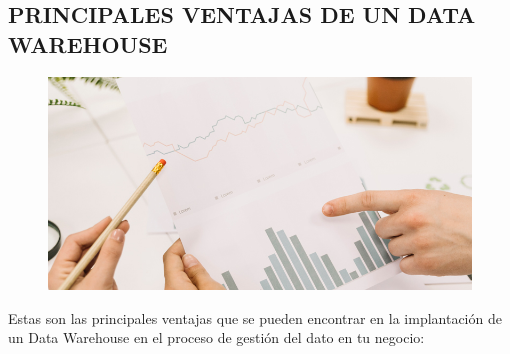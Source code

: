 \documentclass[preprint,12pt]{elsarticle}
\begin{document}
\subsection{PRINCIPALES VENTAJAS DE UN DATA WAREHOUSE}	
\begin{figure}[htb]
				\begin{center}
					\includegraphics[width=15cm]{./IMAGENES/leydi1}
				\end{center}
			\end{figure}
Estas son las principales ventajas que se pueden encontrar en la implantación de un Data Warehouse en el proceso de gestión del dato en tu negocio:
\end{document}
